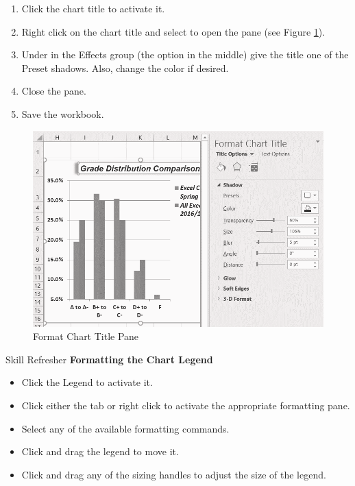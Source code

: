\begin{enumerate}
	\item Click the chart title to activate it.
	\item Right click on the chart title and select  to open the  pane (see Figure \ref{04:fig32}).
	\item Under  in the Effects group (the option in the middle) give the title one of the Preset shadows. Also, change the color if desired.
	\item Close the  pane.
	\item Save the workbook.
\end{enumerate}

\begin{figure}[H]
	\centering
	\includegraphics[width=\maxwidth{.95\linewidth}]{gfx/ch04_fig32}
	\caption{Format Chart Title Pane}
	\label{04:fig32}
\end{figure}

\begin{center}
	\begin{sklbox}{Skill Refresher}
		\textbf{Formatting the Chart Legend}
		\\
		\begin{itemize}
			\setlength{\itemsep}{0pt}
			\setlength{\parskip}{0pt}
			\setlength{\parsep}{0pt}

			\item Click the Legend to activate it.
			\item Click either the  tab or right click to activate the appropriate formatting pane.
			\item Select any of the available formatting commands.
			\item Click and drag the legend to move it.
			\item Click and drag any of the sizing handles to adjust the size of the legend.
			
		\end{itemize}
	\end{sklbox}
\end{center}


